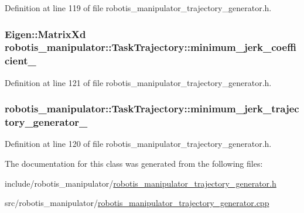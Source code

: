 Definition at line 119 of file robotis\+\_\+manipulator\+\_\+trajectory\+\_\+generator.\+h.

\subsubsection[{\texorpdfstring{minimum\+\_\+jerk\+\_\+coefficient\+\_\+}{minimum_jerk_coefficient_}}]{\setlength{\rightskip}{0pt plus 5cm}Eigen\+::\+Matrix\+Xd robotis\+\_\+manipulator\+::\+Task\+Trajectory\+::minimum\+\_\+jerk\+\_\+coefficient\+\_\+\hspace{0.3cm}{\ttfamily [private]}}\hypertarget{classrobotis__manipulator_1_1_task_trajectory_a19c6e0525c29db0b3bad7950baa74e42}{}\label{classrobotis__manipulator_1_1_task_trajectory_a19c6e0525c29db0b3bad7950baa74e42}


Definition at line 121 of file robotis\+\_\+manipulator\+\_\+trajectory\+\_\+generator.\+h.

\subsubsection[{\texorpdfstring{minimum\+\_\+jerk\+\_\+trajectory\+\_\+generator\+\_\+}{minimum_jerk_trajectory_generator_}}]{ robotis\+\_\+manipulator\+::\+Task\+Trajectory\+::minimum\+\_\+jerk\+\_\+trajectory\+\_\+generator\+\_\+\hspace{0.3cm}{\ttfamily [private]}}\hypertarget{classrobotis__manipulator_1_1_task_trajectory_aa616787d639765003bd054cc7c59f6d3}{}\label{classrobotis__manipulator_1_1_task_trajectory_aa616787d639765003bd054cc7c59f6d3}


Definition at line 120 of file robotis\+\_\+manipulator\+\_\+trajectory\+\_\+generator.\+h.



The documentation for this class was generated from the following files\+:\begin{DoxyCompactItemize}
\item 
include/robotis\+\_\+manipulator/\hyperlink{robotis__manipulator__trajectory__generator_8h}{robotis\+\_\+manipulator\+\_\+trajectory\+\_\+generator.\+h}\item 
src/robotis\+\_\+manipulator/\hyperlink{robotis__manipulator__trajectory__generator_8cpp}{robotis\+\_\+manipulator\+\_\+trajectory\+\_\+generator.\+cpp}\end{DoxyCompactItemize}
